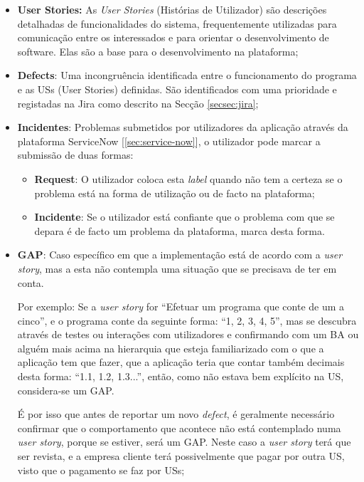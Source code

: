         \begin{itemize}
            \item \textbf{User Stories:} As \textit{User Stories} (Histórias de Utilizador) são descrições detalhadas de funcionalidades do sistema, frequentemente utilizadas para comunicação entre os interessados e para orientar o desenvolvimento de software. Elas são a base para o desenvolvimento na plataforma;

            \item \textbf{Defects}\label{bulletlist:defects}: Uma incongruência identificada entre o funcionamento do programa e as USs (User Stories) definidas. São identificados com uma prioridade e registadas na Jira como descrito na Secção \ref{secsec:jira};
            
            \item \textbf{Incidentes}\label{bulletlist:incidentes}: Problemas submetidos por utilizadores da aplicação através da plataforma ServiceNow [\ref{sec:service-now}], o utilizador pode marcar a submissão de duas formas:
            \begin{itemize}
                \item \textbf{Request}: O utilizador coloca esta \textit{label} quando não tem a certeza se o problema está na forma de utilização ou de facto na plataforma;
                \item \textbf{Incidente}: Se o utilizador está confiante que o problema com que se depara é de facto um problema da plataforma, marca desta forma.
            \end{itemize}

            \item \textbf{GAP}: Caso específico em que a implementação está de acordo com a \textit{user story}, mas a esta não contempla uma situação que se precisava de ter em conta.
            
            Por exemplo: Se a \textit{user story} for ``Efetuar um programa que conte de um a cinco'', e o programa conte da seguinte forma: ``1, 2, 3, 4, 5'', mas se descubra através de testes ou interações com utilizadores e confirmando com um BA ou alguém mais acima na hierarquia que esteja familiarizado com o que a aplicação tem que fazer, que a aplicação teria que contar também decimais desta forma: ``1.1, 1.2, 1.3...'', então, como não estava bem explícito na US, considera-se um GAP.
            
            É por isso que antes de reportar um novo \textit{defect}, é geralmente necessário confirmar que o comportamento que acontece não está contemplado numa \textit{user story}, porque se estiver, será um GAP. Neste caso a \textit{user story} terá que ser revista, e a empresa cliente terá possivelmente que pagar por outra US, visto que o pagamento se faz por USs;
            

\end{itemize}
